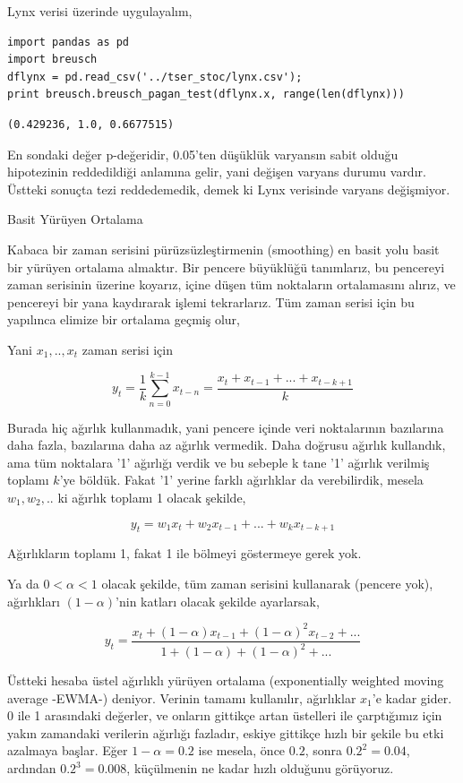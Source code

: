 \documentclass[12pt,fleqn]{article}\usepackage{../../common}
\begin{document}
\inputminted[fontsize=\footnotesize]{python}{breusch.py}

Lynx verisi üzerinde uygulayalım,

\begin{verbatim}
import pandas as pd
import breusch
dflynx = pd.read_csv('../tser_stoc/lynx.csv');
print breusch.breusch_pagan_test(dflynx.x, range(len(dflynx)))
\end{verbatim}

\begin{verbatim}
(0.429236, 1.0, 0.6677515)
\end{verbatim}

En sondaki değer p-değeridir, 0.05'ten düşüklük varyansın sabit olduğu
hipotezinin reddedildiği anlamına gelir, yani değişen varyans durumu
vardır. Üstteki sonuçta tezi reddedemedik, demek ki Lynx verisinde varyans
değişmiyor.

Basit Yürüyen Ortalama

Kabaca bir zaman serisini pürüzsüzleştirmenin (smoothing) en basit yolu
basit bir yürüyen ortalama almaktır. Bir pencere büyüklüğü tanımlarız, bu
pencereyi zaman serisinin üzerine koyarız, içine düşen tüm noktaların
ortalamasını alırız, ve pencereyi bir yana kaydırarak işlemi tekrarlarız. 
Tüm zaman serisi için bu yapılınca elimize bir ortalama geçmiş olur,

Yani $x_1,..,x_t$ zaman serisi için 

$$ 
y_t = \frac{1}{k} \sum_{n=0}^{k-1} x_{t-n}  
= \frac{x_t + x_{t-1} + ... + x_{t-k+1}}{k} 
$$

Burada hiç ağırlık kullanmadık, yani pencere içinde veri noktalarının
bazılarına daha fazla, bazılarına daha az ağırlık vermedik. Daha doğrusu
ağırlık kullandık, ama tüm noktalara '1' ağırlığı verdik ve bu sebeple k
tane '1' ağırlık verilmiş toplamı $k$'ye böldük. Fakat '1' yerine farklı
ağırlıklar da verebilirdik, mesela $w_1,w_2,..$ ki ağırlık toplamı 1 olacak
şekilde, 

$$ y_t = w_1x_t + w_2x_{t-1} + ... + w_kx_{t-k+1}
$$

Ağırlıkların toplamı 1, fakat 1 ile bölmeyi göstermeye gerek yok. 

Ya da $0 < \alpha < 1$ olacak şekilde, tüm zaman serisini kullanarak
(pencere yok), ağırlıkları $(1-\alpha)$'nin katları olacak şekilde
ayarlarsak,

$$ y_t = \frac{x_t + (1-\alpha)x_{t-1} + (1-\alpha)^2x_{t-2} + ... }
{1 + (1-\alpha) + (1-\alpha)^2 + ...} 
$$

Üstteki hesaba üstel ağırlıklı yürüyen ortalama (exponentially weighted
moving average -EWMA-) deniyor. Verinin tamamı kullanılır, ağırlıklar
$x_1$'e kadar gider. 0 ile 1 arasındaki değerler, ve onların gittikçe artan
üstelleri ile çarptığımız için yakın zamandaki verilerin ağırlığı fazladır,
eskiye gittikçe hızlı bir şekile bu etki azalmaya başlar. Eğer
$1-\alpha=0.2$ ise mesela, önce $0.2$, sonra $0.2^2=0.04$, ardından
$0.2^3=0.008$, küçülmenin ne kadar hızlı olduğunu görüyoruz.
\end{document}
